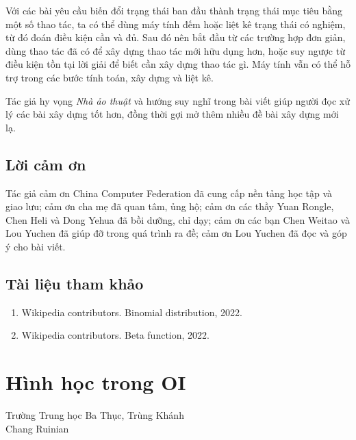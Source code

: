 \documentclass[11pt]{article}
\begin{document}
Với các bài yêu cầu biến đổi trạng thái ban đầu thành trạng thái mục tiêu bằng
một số thao tác, ta có thể dùng máy tính đếm hoặc liệt kê trạng thái có nghiệm,
từ đó đoán điều kiện cần và đủ. Sau đó nên bắt đầu từ các trường hợp đơn giản,
dùng thao tác đã có để xây dựng thao tác mới hữu dụng hơn, hoặc suy ngược từ
điều kiện tồn tại lời giải để biết cần xây dựng thao tác gì. Máy tính vẫn có thể
hỗ trợ trong các bước tính toán, xây dựng và liệt kê.

Tác giả hy vọng \emph{Nhà ảo thuật} và hướng suy nghĩ trong bài viết giúp người
đọc xử lý các bài xây dựng tốt hơn, đồng thời gợi mở thêm nhiều đề bài xây dựng
mới lạ.

\subsection{Lời cảm ơn}

Tác giả cảm ơn China Computer Federation đã cung cấp nền tảng học tập và giao
lưu; cảm ơn cha mẹ đã quan tâm, ủng hộ; cảm ơn các thầy Yuan Rongle, Chen Heli
và Dong Yehua đã bồi dưỡng, chỉ dạy; cảm ơn các bạn Chen Weitao và Lou Yuchen
đã giúp đỡ trong quá trình ra đề; cảm ơn Lou Yuchen đã đọc và góp ý cho bài
viết.

\subsection{Tài liệu tham khảo}

\begin{enumerate}
  \item Wikipedia contributors. Binomial distribution, 2022.
  \item Wikipedia contributors. Beta function, 2022.
\end{enumerate}

\section{Hình học trong OI}

\begin{center}
Trường Trung học Ba Thục, Trùng Khánh\\
Chang Ruinian
\end{center}

\renewcommand{\abstractname}{Tóm tắt}
\begin{abstract}
Các bài toán hình học thường đi kèm trực giác trực quan, còn trực giác trong OI
thường gắn với tối ưu tổ hợp. Vì vậy hình học không phải mảng quá phổ biến
trong OI, trong khi ở những kỳ thi như ACM, do yêu cầu cân bằng đề, thường vẫn
có một bài hình học tính toán chất lượng. Tác giả cho rằng hình học nên được
xem như một loại bài quan trọng trong OI, bởi không gian vật lý vốn liên tục và
nhiều bài toán tối ưu trong đời sống có thể nhìn dưới góc độ hình học.

Bài viết thử tổng kết ở mức nhập môn một số vấn đề hình học trong OI. Phần đầu
nói về hình học tính toán, mở rộng các khái niệm tam giác hóa, ứng dụng của nó
và phép nghịch đảo tròn. Phần thứ hai trình bày các đối tượng hình học liên
quan đến cấu trúc dữ liệu. Phần thứ ba giới thiệu hình học hữu hạn, phần trừu
tượng nhất của bài viết.
\end{abstract}
\end{document}
